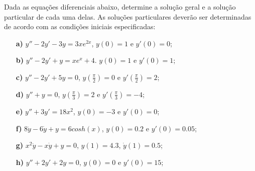 \linespread{1.5}
Dada as equações diferenciais abaixo, determine a solução geral e a solução particular de cada uma delas. As soluções particulares deverão ser determinadas de acordo com as condições iniciais especificadas:
\begin{itemize}
    \item[\textbf{a)}] $y'' - 2y' - 3y = 3xe^{2x}$, $y(0) = 1$ e $y'(0) = 0$;
    \item[\textbf{b)}] $y'' - 2y' + y = xe^x + 4$. $y(0) = 1$ e $y'(0) = 1$;
    \item[\textbf{c)}] $y'' - 2y' + 5y = 0$, $y\left(\frac{\pi}{2}\right) = 0$ e $y'\left(\frac{\pi}{2}\right) = 2$;
    \item[\textbf{d)}] $y'' + y = 0$, $y\left(\frac{\pi}{3}\right) = 2$ e $y'\left(\frac{\pi}{3}\right) = -4$;
    \item[\textbf{e)}] $y'' + 3y' = 18x^2$, $y(0) = -3$ e $y'(0) = 0$;
    \item[\textbf{f)}] $8\ddot{y} - 6\dot{y} + y = 6cosh(x)$, $y(0) = 0.2$ e $y'(0) = 0.05$;
    \item[\textbf{g)}] $x^2\ddot{y} - x\dot{y} + y = 0$, $y(1) = 4.3$, $\dot{y}(1) = 0.5$;
    \item[\textbf{h)}] $y'' + 2y' + 2y = 0$, $y(0) = 0$ e $y'(0) = 15$;
\end{itemize}